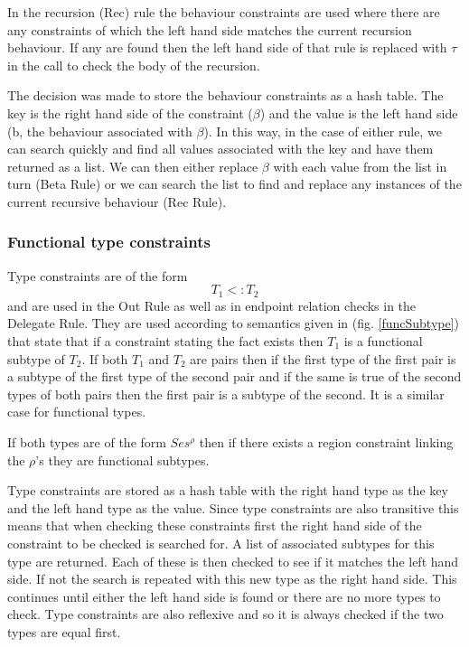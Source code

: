 In the recursion (Rec) rule the behaviour constraints are used where there are any constraints of which the left hand side matches the current recursion behaviour. If any are found then the left hand side of that rule is replaced with $\tau$ in the call to check the body of the recursion. 

The decision was made to store the behaviour constraints as a hash table. The key is the right hand side of the constraint ($\beta$) and the value is the left hand side (b, the behaviour associated with $\beta$). In this way, in the case of either rule, we can search quickly and find all values associated with the key and have them returned as a list. We can then either replace $\beta$ with each value from the list in turn (Beta Rule) or we can search the list to find and replace any instances of the current recursive behaviour (Rec Rule). 

\subsubsection{Functional type constraints}

Type constraints are of the form $$T_1 <: T_2$$ and are used in the Out Rule as well as in endpoint relation checks in the Delegate Rule. They are used according to semantics given in (fig. \ref{funcSubtype}) that state that if a constraint stating the fact exists then $T_1$ is a functional subtype of $T_2$. If both $T_1$ and $T_2$ are pairs then if the first type of the first pair is a subtype of the first type of the second pair and if the same is true of the second types of both pairs then the first pair is a subtype of the second. It is a similar case for functional types.

If both types are of the form $Ses^{\rho}$ then if there exists a region constraint linking the $\rho$'s  they are functional subtypes.

Type constraints are stored as a hash table with the right hand type as the key and the left hand type as the value. Since type constraints are also transitive this means that when checking these constraints first the right hand side of the constraint to be checked is searched for. A list of associated subtypes for this type are returned. Each of these is then checked to see if it matches the left hand side. If not the search is repeated with this new type as the right hand side. This continues until either the left hand side is found or there are no more types to check. Type constraints are also reflexive and so it is always checked if the two types are equal first.

